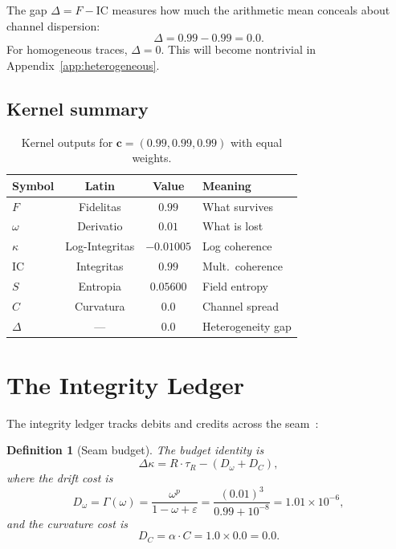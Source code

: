 \documentclass[
  aps,
  prd,
  twocolumn,
  superscriptaddress,
  nofootinbib,
  floatfix
]{revtex4-2}
\newtheorem{definition}[theorem]{Definition}
\newcommand{\tR}{\tau_{\!R}}
\newcommand{\Gam}{\Gamma}
\newcommand{\eps}{\varepsilon}
\newcommand{\beq}{\begin{equation}}
\newcommand{\eeq}{\end{equation}}
\newcommand{\tvec}{\mathbf{c}}
\newcommand{\IC}{\mathrm{IC}}
\begin{document}
The gap $\Delta = F - \IC$ measures how much the arithmetic mean
conceals about channel dispersion:
\beq
  \Delta = 0.99 - 0.99 = 0.0.
\eeq
For homogeneous traces, $\Delta = 0$.  This will become nontrivial
in Appendix~\ref{app:heterogeneous}.

\subsection{Kernel summary}

\begin{table}[ht]
\caption{Kernel outputs for $\tvec = (0.99, 0.99, 0.99)$ with
  equal weights.}
\label{tab:kernel}
\begin{ruledtabular}
\begin{tabular}{lccl}
  Symbol & Latin & Value & Meaning \\
  \hline
  $F$ & Fidelitas & $0.99$ & What survives \\
  $\omega$ & Derivatio & $0.01$ & What is lost \\
  $\kappa$ & Log-Integritas & $-0.01005$ & Log coherence \\
  $\IC$ & Integritas & $0.99$ & Mult.\ coherence \\
  $S$ & Entropia & $0.05600$ & Field entropy \\
  $C$ & Curvatura & $0.0$ & Channel spread \\
  $\Delta$ & --- & $0.0$ & Heterogeneity gap \\
\end{tabular}
\end{ruledtabular}
\end{table}

\section{The Integrity Ledger}\label{sec:ledger}

The integrity ledger tracks debits and credits across the
seam~\cite{paulus2025seams}:

\begin{definition}[Seam budget]\label{def:seam}
The budget identity is
\beq\label{eq:budget}
  \Delta\kappa = R \cdot \tR - (D_\omega + D_C),
\eeq
where the drift cost is
\beq\label{eq:Domega}
  D_\omega = \Gam(\omega) = \frac{\omega^p}{1 - \omega + \eps}
  = \frac{(0.01)^3}{0.99 + 10^{-8}} = 1.01 \times 10^{-6},
\eeq
and the curvature cost is
\beq\label{eq:DC}
  D_C = \alpha \cdot C = 1.0 \times 0.0 = 0.0.
\eeq
\end{definition}
\end{document}
